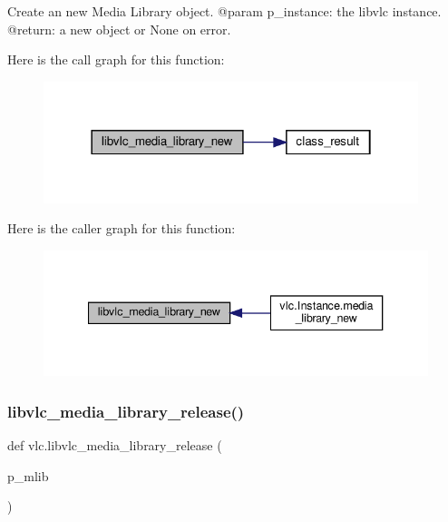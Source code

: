 \begin{DoxyVerb}Create an new Media Library object.
@param p_instance: the libvlc instance.
@return: a new object or None on error.
\end{DoxyVerb}
 Here is the call graph for this function\+:
\nopagebreak
\begin{figure}[H]
\begin{center}
\leavevmode
\includegraphics[width=310pt]{namespacevlc_a4f0c42c16464e769b411cbcf38091eeb_cgraph}
\end{center}
\end{figure}
Here is the caller graph for this function\+:
\nopagebreak
\begin{figure}[H]
\begin{center}
\leavevmode
\includegraphics[width=340pt]{namespacevlc_a4f0c42c16464e769b411cbcf38091eeb_icgraph}
\end{center}
\end{figure}
\mbox{\label{namespacevlc_ab8ba23cb322d7e138eb8873e23796646}} 
\subsubsection{\texorpdfstring{libvlc\+\_\+media\+\_\+library\+\_\+release()}{libvlc\_media\_library\_release()}}
{\footnotesize\ttfamily def vlc.\+libvlc\+\_\+media\+\_\+library\+\_\+release (\begin{DoxyParamCaption}\item[{}]{p\+\_\+mlib }\end{DoxyParamCaption})}

